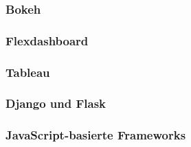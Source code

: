 \subsubsection{Bokeh}

\subsubsection{Flexdashboard}

\subsubsection{Tableau}

\subsubsection{Django und Flask}

\subsubsection{JavaScript-basierte Frameworks}

